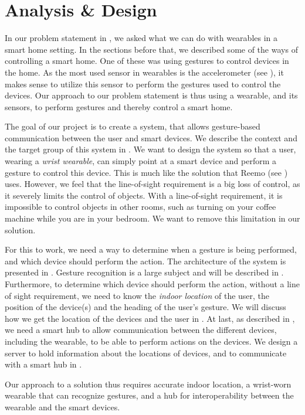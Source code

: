 \chapter{Analysis \& Design}\label{chap:design}\label{chap:analysis}
In our problem statement in , 
we asked what we can do with wearables in a smart home setting.
In the sections before that, 
we described some of the ways of controlling a smart home. 
One of these was using gestures to control devices in the home. 
As the most used sensor in wearables is the accelerometer (see ), 
it makes sense to utilize this sensor to perform the gestures used to control the devices. 
Our approach to our problem statement is thus using a wearable, 
and its sensors, to perform gestures and thereby control a smart home. 

The goal of our project is to create a system, 
that allows gesture-based communication between the user and smart devices.
We describe the context and the target group of this system in .
We want to design the system so that a user, wearing a \emph{wrist wearable}, 
can simply point at a smart device and perform a gesture to control this device. 
This is much like the solution that Reemo (see ) uses. 
However, we feel that the line-of-sight requirement is a big loss of control, 
as it severely limits the control of objects.
With a line-of-sight requirement, 
it is impossible to control objects in other rooms, 
such as turning on your coffee machine while you are in your bedroom. 
We want to remove this limitation in our solution. 

For this to work, we need a way to determine when a gesture is being performed, 
and which device should perform the action. 
The architecture of the system is presented in .
Gesture recognition is a large subject and will be described in . 
Furthermore, to determine which device should perform the action, 
without a line of sight requirement, 
we need to know the \emph{indoor location} of the user, 
the position of the device(s) and the heading of the user's gesture. 
We will discuss how we get the location of the devices and the user in .
At last, as described in , 
we need a smart hub to allow communication between the different devices, 
including the wearable, to be able to perform actions on the devices. 
We design a server to hold information about the locations of devices,
and to communicate with a smart hub in . 

Our approach to a solution thus requires accurate indoor location, 
a wrist-worn wearable that can recognize gestures, 
and a hub for interoperability between the wearable and the smart devices. 








